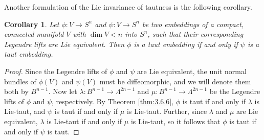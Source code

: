 \documentclass[12pt]{article}
\newtheorem{corollary}{Corollary}[section]
\begin{document}
\noindent
Another formulation of the Lie invariance of tautness is the following corollary.

\begin{corollary}
\label{cor:3.6.7} 
Let $\phi:V \rightarrow S^n$ and $\psi:V \rightarrow S^n$ be two embeddings of a compact, connected  
manifold $V$ with $\dim V < n$ into $S^n$, 
such that their corresponding Legendre lifts are Lie equivalent.
Then $\phi$ is a taut embedding  if and only if $\psi$ is a taut embedding.
\end{corollary}
\begin{proof}
Since the Legendre lifts of $\phi$ and $\psi$ are Lie equivalent, the unit normal bundles of $\phi (V)$ and 
$\psi (V)$ must be diffeomorphic, and we will denote them both by $B^{n-1}$. Now 
let $\lambda: B^{n-1} \rightarrow \Lambda^{2n-1}$ and $\mu: B^{n-1} \rightarrow \Lambda^{2n-1}$ be the Legendre
lifts of $\phi$ and $\psi$, respectively.  By Theorem \ref{thm:3.6.6}, $\phi$ is taut if and only if $\lambda$ is
Lie-taut, and $\psi$ is taut if and only if $\mu$ is Lie-taut.  Further, since $\lambda$ and $\mu$ are Lie equivalent,
$\lambda$ is Lie-taut if and only if $\mu$ is Lie-taut, so it follows that $\phi$ is taut if and only if $\psi$ is taut.
\end{proof}
\end{document}

